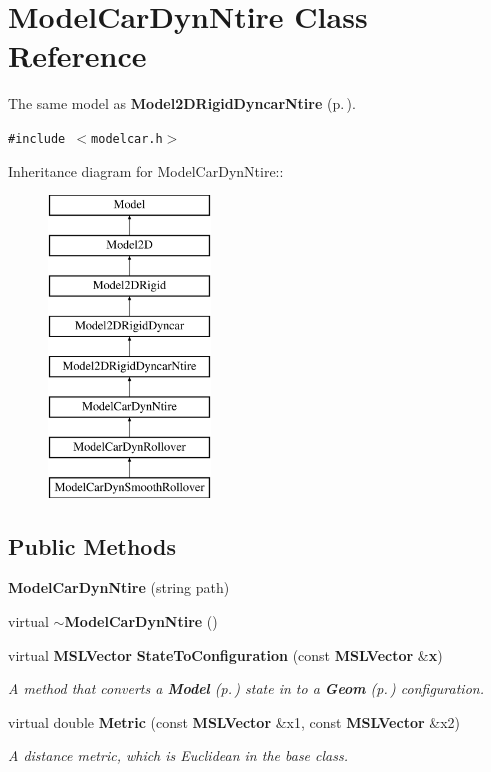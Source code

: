 \section{Model\-Car\-Dyn\-Ntire  Class Reference}
\label{classModelCarDynNtire}
The same model as {\bf Model2DRigid\-Dyncar\-Ntire} {\rm (p.\,\pageref{classModel2DRigidDyncarNtire})}. 


{\tt \#include $<$modelcar.h$>$}

Inheritance diagram for Model\-Car\-Dyn\-Ntire::\begin{figure}[H]
\begin{center}
\leavevmode
\includegraphics[height=8cm]{classModelCarDynNtire}
\end{center}
\end{figure}
\subsection*{Public Methods}
\begin{CompactItemize}
\item 
{\bf Model\-Car\-Dyn\-Ntire} (string path)
\item 
virtual {\bf $\sim$Model\-Car\-Dyn\-Ntire} ()
\item 
virtual {\bf MSLVector} {\bf State\-To\-Configuration} (const {\bf MSLVector} \&{\bf x})
\begin{CompactList}\small\item\em A method that converts a {\bf Model} {\rm (p.\,\pageref{classModel})} state in to a {\bf Geom} {\rm (p.\,\pageref{classGeom})} configuration.\item\end{CompactList}\item 
virtual double {\bf Metric} (const {\bf MSLVector} \&x1, const {\bf MSLVector} \&x2)
\begin{CompactList}\small\item\em A distance metric, which is Euclidean in the base class.\item\end{CompactList}\end{CompactItemize}


